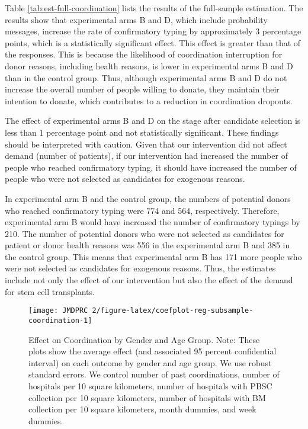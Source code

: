 \documentclass[
  11pt,
  a4paper
]{article}
\begin{document}
Table \ref{tab:est-full-coordination} lists the results of the full-sample estimation. The results show that experimental arms B and D, which include probability messages, increase the rate of confirmatory typing by approximately 3 percentage points, which is a statistically significant effect. This effect is greater than that of the responses. This is because the likelihood of coordination interruption for donor reasons, including health reasons, is lower in experimental arms B and D than in the control group. Thus, although experimental arms B and D do not increase the overall number of people willing to donate, they maintain their intention to donate, which contributes to a reduction in coordination dropouts.

The effect of experimental arms B and D on the stage after candidate selection is less than 1 percentage point and not statistically significant. These findings should be interpreted with caution. Given that our intervention did not affect demand (number of patients), if our intervention had increased the number of people who reached confirmatory typing, it should have increased the number of people who were not selected as candidates for exogenous reasons.

In experimental arm B and the control group, the numbers of potential donors who reached confirmatory typing were 774 and 564, respectively. Therefore, experimental arm B would have increased the number of confirmatory typings by 210. The number of potential donors who were not selected as candidates for patient or donor health reasons was 556 in the experimental arm B and 385 in the control group. This means that experimental arm B has 171 more people who were not selected as candidates for exogenous reasons. Thus, the estimates include not only the effect of our intervention but also the effect of the demand for stem cell transplants.

\begin{figure}[t]
\texttt{[image: JMDPRC~2/figure-latex/coefplot-reg-subsample-coordination-1]} \caption{Effect on Coordination by Gender and Age Group. Note: These plots show the average effect (and associated 95 percent confidential interval) on each outcome by gender and age group. We use robust standard errors. We control number of past coordinations, number of hospitals per 10 square kilometers, number of hospitals with PBSC collection per 10 square kilometers, number of hospitals with BM collection per 10 square kilometers, month dummies, and week dummies.}\label{fig:coefplot-reg-subsample-coordination}
\end{figure}
\end{document}
